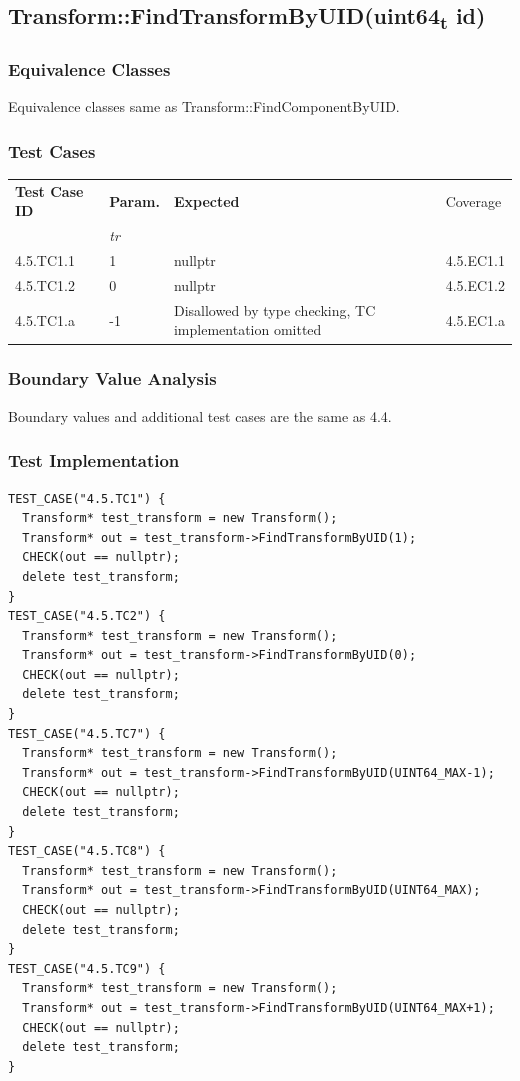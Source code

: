 \documentclass[11pt]{article}
\begin{document}
\clearpage
\subsection{Transform::FindTransformByUID(uint64\textsubscript{t} id)}
\label{sec:org06545f8}

\subsubsection*{Equivalence Classes}
\label{sec:org7798b68}
Equivalence classes same as Transform::FindComponentByUID.
\subsubsection*{Test Cases}
\label{sec:orgbaedd2d}
\begin{center}
\begin{tabularx}{\textwidth}{lXXX}
\hline
\textbf{Test Case ID} & \textbf{Param.} & \textbf{Expected} & Coverage\\
 & \textit{tr} &  & \\
\hline
4.5.TC1.1 & 1 & nullptr & 4.5.EC1.1\\
\hline
4.5.TC1.2 & 0 & nullptr & 4.5.EC1.2\\
\hline
4.5.TC1.a & -1 & Disallowed by type checking, TC implementation omitted & 4.5.EC1.a\\
\hline
\end{tabularx}
\end{center}
\subsubsection*{Boundary Value Analysis}
\label{sec:org223de52}
Boundary values and additional test cases are the same as 4.4.
\subsubsection*{Test Implementation}
\label{sec:org84d41cd}
\begin{verbatim}
TEST_CASE("4.5.TC1") {
  Transform* test_transform = new Transform();
  Transform* out = test_transform->FindTransformByUID(1);
  CHECK(out == nullptr);
  delete test_transform;
}
TEST_CASE("4.5.TC2") {
  Transform* test_transform = new Transform();
  Transform* out = test_transform->FindTransformByUID(0);
  CHECK(out == nullptr);
  delete test_transform;
}
TEST_CASE("4.5.TC7") {
  Transform* test_transform = new Transform();
  Transform* out = test_transform->FindTransformByUID(UINT64_MAX-1);
  CHECK(out == nullptr);
  delete test_transform;
}
TEST_CASE("4.5.TC8") {
  Transform* test_transform = new Transform();
  Transform* out = test_transform->FindTransformByUID(UINT64_MAX);
  CHECK(out == nullptr);
  delete test_transform;
}
TEST_CASE("4.5.TC9") {
  Transform* test_transform = new Transform();
  Transform* out = test_transform->FindTransformByUID(UINT64_MAX+1);
  CHECK(out == nullptr);
  delete test_transform;
}

\end{verbatim}
\end{document}
